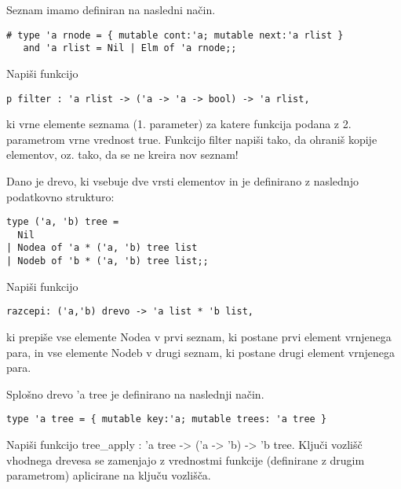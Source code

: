 \begin{ex}
Seznam imamo definiran na nasledni na\v cin. 
\begin{lstlisting}
# type 'a rnode = { mutable cont:'a; mutable next:'a rlist } 
   and 'a rlist = Nil | Elm of 'a rnode;; 
\end{lstlisting}
Napi\v si funkcijo 
\begin{lstlisting}
p filter : 'a rlist -> ('a -> 'a -> bool) -> 'a rlist,
\end{lstlisting}
 ki vrne elemente seznama (1. parameter) za katere funkcija podana z 2. parametrom vrne vrednost true.
Funkcijo filter napi\v si tako, da ohrani\v s kopije elementov, oz. tako, da se ne kreira nov seznam!


\end{ex} 
\begin{ex}
Dano je drevo, ki vsebuje dve vrsti elementov in je definirano z naslednjo podatkovno strukturo:
\begin{lstlisting}
type ('a, 'b) tree = 
  Nil
| Nodea of 'a * ('a, 'b) tree list 
| Nodeb of 'b * ('a, 'b) tree list;; 
\end{lstlisting}
Napi\v si funkcijo 

\begin{lstlisting}
razcepi: ('a,'b) drevo -> 'a list * 'b list, 
\end{lstlisting}
ki prepi\v se vse elemente Nodea v prvi seznam, ki postane prvi element vrnjenega para, in vse elemente Nodeb v drugi seznam, ki postane drugi element vrnjenega para.


\end{ex} 
\begin{ex}
  Splo\v sno drevo 'a tree je definirano na naslednji na\v cin.

\begin{lstlisting}
type 'a tree = { mutable key:'a; mutable trees: 'a tree }
\end{lstlisting}

  Napi\v si funkcijo tree\_apply : 'a tree -> ('a -> 'b) -> 'b
  tree. Klju\v ci vozli\v s\v c vhodnega drevesa se zamenjajo z
  vrednostmi funkcije (definirane z drugim parametrom) aplicirane na
  klju\v cu vozli\v s\v ca.

\end{ex} 
